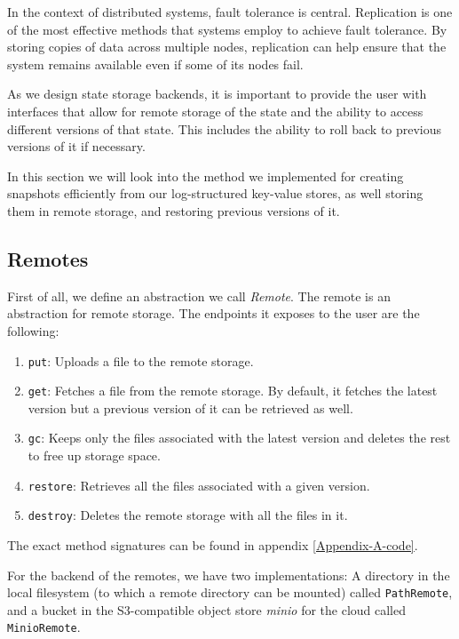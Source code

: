 In the context of distributed systems, fault tolerance is central.
Replication is one of the most effective methods that systems employ to achieve fault tolerance. By storing copies of data across multiple nodes, replication can help ensure that the system remains available even if some of its nodes fail.

As we design state storage backends, it is important to provide the user with interfaces that allow for remote storage of the state and the ability to access different versions of that state. This includes the ability to roll back to previous versions of it if necessary.

In this section we will look into the method we implemented for creating snapshots efficiently from our log-structured key-value stores, as well storing them in remote storage, and restoring previous versions of it.

\subsection{Remotes}

First of all, we define an abstraction we call \textit{Remote}.
The remote is an abstraction for remote storage.
The endpoints it exposes to the user are the following:

\begin{enumerate}
    \item \verb|put|: Uploads a file to the remote storage.
    \item \verb|get|: Fetches a file from the remote storage. By default, it fetches the latest version but a previous version of it can be retrieved as well.
    \item \verb|gc|: Keeps only the files associated with the latest version and deletes the rest to free up storage space.
    \item \verb|restore|: Retrieves all the files associated with a given version.
    \item \verb|destroy|: Deletes the remote storage with all the files in it.
\end{enumerate}

The exact method signatures can be found in appendix \ref{Appendix-A-code}.

For the backend of the remotes, we have two implementations: A directory in the local filesystem (to which a remote directory can be mounted) called \verb|PathRemote|, and a bucket in the S3-compatible object store \textit{minio} for the cloud called \verb|MinioRemote|.

